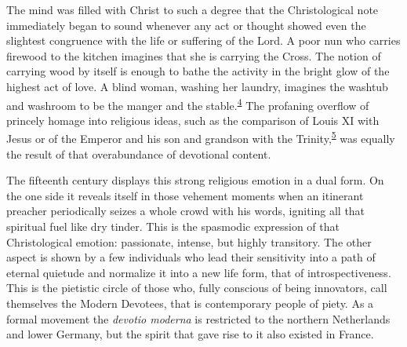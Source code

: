 The mind was filled with Christ to such a degree that the Christological
note immediately began to sound whenever any act or thought showed even
the slightest congruence with the life or suffering of the Lord. A poor
nun who carries firewood to the kitchen imagines that she is carrying
the Cross. The notion of carrying wood by itself is enough to bathe the
activity in the bright glow
\protect\hypertarget{15_Chapter_Eight__RELIGIOUS_EXCITAT.xhtmlux5cux23page_221}{}{}of
the highest act of love. A blind woman, washing her laundry, imagines
the washtub and washroom to be the manger and the
stable.\textsuperscript{\protect\hypertarget{15_Chapter_Eight__RELIGIOUS_EXCITAT.xhtmlux5cux23id_899}{\protect\hyperlink{23_NOTES.xhtmlux5cux23id_900}{4}}}
The profaning overflow of princely homage into religious ideas, such as
the comparison of Louis XI with Jesus or of the Emperor and his son and
grandson with the
Trinity,\textsuperscript{\protect\hypertarget{15_Chapter_Eight__RELIGIOUS_EXCITAT.xhtmlux5cux23id_897}{\protect\hyperlink{23_NOTES.xhtmlux5cux23id_898}{5}}}
was equally the result of that overabundance of devotional content.

The fifteenth century displays this strong religious emotion in a dual
form. On the one side it reveals itself in those vehement moments when
an itinerant preacher periodically seizes a whole crowd with his words,
igniting all that spiritual fuel like dry tinder. This is the spasmodic
expression of that Christological emotion: passionate, intense, but
highly transitory. The other aspect is shown by a few individuals who
lead their sensitivity into a path of eternal quietude and normalize it
into a new life form, that of introspectiveness. This is the pietistic
circle of those who, fully conscious of being innovators, call
themselves the Modern Devotees, that is contemporary people of piety. As
a formal movement the \emph{devotio moderna} is restricted to the
northern Netherlands and lower Germany, but the spirit that gave rise to
it also existed in France.

